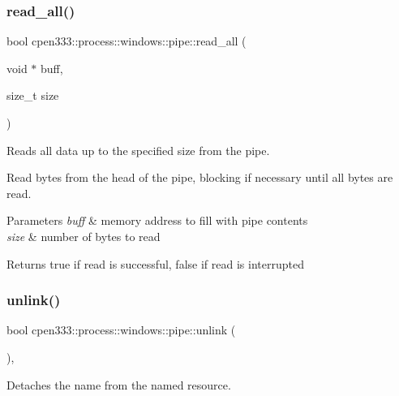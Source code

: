 \subsubsection{\texorpdfstring{read\+\_\+all()}{read\_all()}}
{\footnotesize\ttfamily bool cpen333\+::process\+::windows\+::pipe\+::read\+\_\+all (\begin{DoxyParamCaption}\item[{void $\ast$}]{buff,  }\item[{size\+\_\+t}]{size }\end{DoxyParamCaption})\hspace{0.3cm}{\ttfamily [inline]}}



Reads all data up to the specified size from the pipe. 

Read bytes from the head of the pipe, blocking if necessary until all bytes are read.


\begin{DoxyParams}{Parameters}
{\em buff} & memory address to fill with pipe contents \\
\hline
{\em size} & number of bytes to read \\
\hline
\end{DoxyParams}
\begin{DoxyReturn}{Returns}
true if read is successful, false if read is interrupted 
\end{DoxyReturn}
\mbox{\label{classcpen333_1_1process_1_1windows_1_1pipe_abe0bc707040aa7e82ed41c26cc4c93c1}} 
\subsubsection{\texorpdfstring{unlink()}{unlink()}\hspace{0.1cm}{\footnotesize\ttfamily [1/2]}}
{\footnotesize\ttfamily bool cpen333\+::process\+::windows\+::pipe\+::unlink (\begin{DoxyParamCaption}{ }\end{DoxyParamCaption})\hspace{0.3cm}{\ttfamily [inline]}, {\ttfamily [virtual]}}



Detaches the name from the named resource. 

